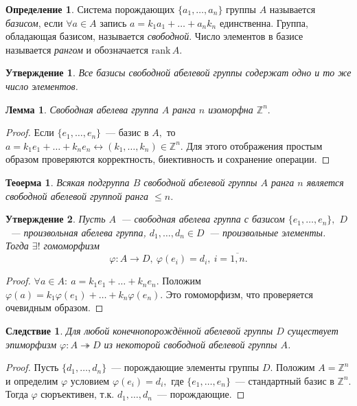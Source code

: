 \documentclass[a4paper, 14pt]{extarticle}
\newcommand{\integers}{\mathbb{Z}}
\newcommand{\suchthat}{{:}{ } \ }
\newcommand{\rank}{\mathrm{rank} \,}
\renewcommand{\phi}{\varphi}
\theoremstyle{definition}
\newtheorem{definition}{Определение}
\theoremstyle{plain}
\newtheorem{theorem}{Теоерма}
\numberwithin{theorem}{section}
\numberwithin{definition}{section}
\newtheorem{statement}{Утверждение}
\numberwithin{statement}{section}
\newtheorem{lemma}{Лемма}
\numberwithin{lemma}{section}
\newtheorem*{consequence*}{Следствие}
\numberwithin{consequence}{section}
\begin{document}
        \begin{definition}
            Система порождающих ${\{a_1,\ldots,a_n\}}$ группы $A$ называется \textit{базисом}, если ${\forall a \in A}$ запись ${a = k_1a_1+\ldots+a_nk_n}$ единственна. Группа, обладающая базисом, называется \textit{свободной}. Число элементов в базисе называется \textit{рангом} и обозначается $\rank A$.
        \end{definition}
        \begin{statement}
            Все базисы свободной абелевой группы содержат одно и то же число элементов.
        \end{statement}
        \newpage
        \begin{lemma}
            Свободная абелева группа $A$ ранга $n$ изоморфна $\integers^n.$
        \end{lemma}
        \begin{proof}
            Если ${\{e_1,\ldots,e_n\}}$~--- базис в $A,$ то ${a = k_1e_1+\ldots+k_ne_n \leftrightarrow (k_1,\ldots,k_n) \in \integers^n.}$ Для этого отображения простым образом проверяются корректность, биективность и сохранение операции.
        \end{proof}
        \begin{theorem}
            Всякая подгруппа $B$ свободной абелевой группы $A$ ранга $n$ является свободной абелевой группой ранга $\leqslant n$. 
        \end{theorem}
        \begin{statement}
            Пусть $A$~--- свободная абелева группа с базисом ${\{e_1,\ldots,e_n\},}$ $D$~--- произвольная абелева группа, ${d_1,\ldots,d_n \in D}$~--- произвольные элементы. Тогда $\exists!$ гомоморфизм 
            \begin{equation*}
                \phi : A \rightarrow D, \ \phi(e_i) = d_i, \ i = \overline{1,n}.
            \end{equation*}
        \end{statement}
        \begin{proof}
            ${\forall a \in A\suchthat a = k_1e_1+\ldots+k_ne_n.}$\newline
            Положим ${\phi(a) = k_1\phi(e_1)+\ldots+k_n\phi(e_n).}$ Это гомоморфизм, что проверяется очевидным образом.
        \end{proof}
        \begin{consequence*}
            Для любой конечнопорождённой абелевой группы $D$ существует эпиморфизм ${\phi : A \twoheadrightarrow D}$ из некоторой свободной абелевой группы $A$. 
        \end{consequence*}
        \begin{proof}
            Пусть ${\{d_1,\ldots,d_n\}}$~--- порождающие элементы группы $D.$ Положим ${A = \integers^n}$ и определим $\phi$ условием ${\phi(e_i) = d_i,}$ где ${\{e_1,\ldots,e_n\}}$~--- стандартный базис в $\integers^n.$ Тогда $\phi$ сюръективен, т.к. ${d_1,\ldots,d_n}$~--- порождающие.
        \end{proof}
        \newpage
\end{document}
